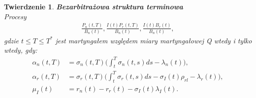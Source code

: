 \documentclass{mini}
\theoremstyle{mythstyle}
\newtheorem{Twierdzenie}{Twierdzenie}[chapter]
\begin{document}
	\begin{Twierdzenie} \textbf{Bezarbitrażowa struktura terminowa}\\
		Procesy
		\begin{eqnarray*}
			\frac{P_n(t,T)}{B_n(t)}, \frac{I(t)P_r(t,T)}{B_n(t)}, \frac{I(t)B_r(t)}{B_n(t)}, 
		\end{eqnarray*}
		gdzie $t \le T \le T^*$ jest martyngałem względem miary martyngałowej Q  wtedy i tylko wtedy, gdy:
		\begin{align}
		\alpha_n(t,T) &= \sigma_n(t,T)\bigg(\int_{t}^{T}\sigma_n(t,s)ds-\lambda_n(t)\bigg),\\
		\alpha_r(t,T) &= \sigma_r(t,T)\bigg(\int_{t}^{T}\sigma_r(t,s)ds-\sigma_I(t)\rho_{rl}-\lambda_r(t)\bigg),\\
		\mu_I(t) &= r_n(t)-r_r(t)-\sigma_I(t)\lambda_I(t).
		\end{align}
	\end{Twierdzenie}
	
\end{document}
